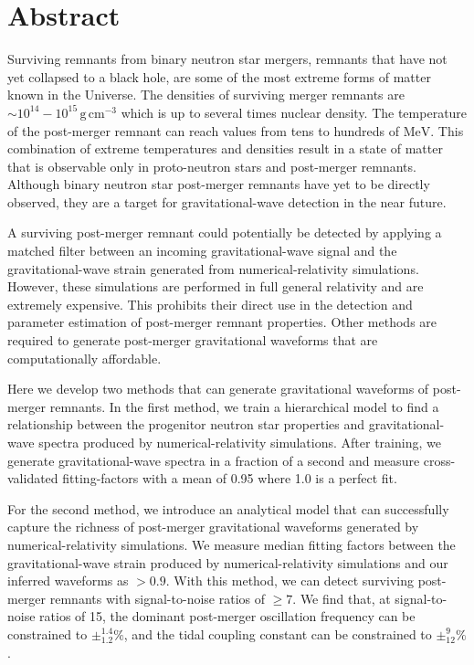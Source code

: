 \documentclass[../Thesis.tex]{subfiles}
\begin{document}
\begingroup
\clearpage%
\let\clearpage\relax%
\vspace*{-2cm}%



\chapter*{Abstract}
\endgroup
{} 

    Surviving remnants from binary neutron star mergers, remnants that have not yet collapsed to a black hole,  are some of the most extreme forms of matter known in the Universe.    
    The densities of surviving merger remnants are $\sim 10^{14}-10^{15}\,\mathrm{g\, cm^{-3}}$ which is up to several times nuclear density.
    The temperature of the post-merger remnant can reach values from tens to hundreds of $\mathrm{MeV}$.
    This combination of extreme temperatures and densities result in a state of matter that is observable only in proto-neutron stars and post-merger remnants.
    Although binary neutron star post-merger remnants have yet to be directly observed, they are a target for gravitational-wave detection in the near future. \par

    A surviving post-merger remnant could potentially be detected by applying a matched filter between an incoming gravitational-wave signal and the gravitational-wave strain generated from numerical-relativity simulations.
    However, these simulations are performed in full general relativity and are extremely expensive.
    This prohibits their direct use in the detection and parameter estimation of post-merger remnant properties.
    Other methods are required to generate post-merger gravitational waveforms that are computationally affordable. \par
    
    Here we develop two methods that can generate gravitational waveforms of post-merger remnants.
    In the first method, we train a hierarchical model to find a relationship between the progenitor neutron star properties and gravitational-wave spectra produced by numerical-relativity simulations.
    After training, we generate gravitational-wave spectra in a fraction of a second and measure cross-validated fitting-factors with a mean of 0.95 where 1.0 is a perfect fit.\par
    
    For the second method, we introduce an analytical model that can successfully capture the richness of post-merger gravitational waveforms generated by numerical-relativity simulations.
    We measure median fitting factors between the gravitational-wave strain produced by numerical-relativity simulations and our inferred waveforms as $> 0.9$.
    With this method, we can detect surviving post-merger remnants with signal-to-noise ratios of $\geqslant 7$.
    We find that, at signal-to-noise ratios of 15, the dominant post-merger oscillation frequency can be constrained to $\pm_{1.2}^{1.4}\%$, and the tidal coupling constant can be constrained to $\pm^{9}_{12}\%$. \par
\end{document}
